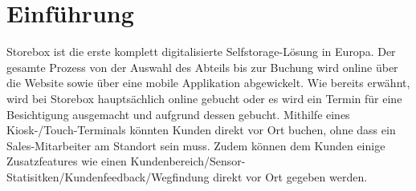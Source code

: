 
\section{Einführung}
Storebox ist die erste komplett digitalisierte Selfstorage-Lösung in Europa. Der gesamte Prozess von der Auswahl des Abteils bis zur Buchung wird online über die Website sowie über eine mobile Applikation abgewickelt. Wie bereits erwähnt, wird bei Storebox hauptsächlich online gebucht oder es wird ein Termin für eine Besichtigung ausgemacht und aufgrund dessen gebucht. Mithilfe eines Kiosk-/Touch-Terminals könnten Kunden direkt vor Ort buchen, ohne dass ein Sales-Mitarbeiter am Standort sein muss. Zudem können dem Kunden einige Zusatzfeatures wie einen Kundenbereich/Sensor-Statisitken/Kundenfeedback/Wegfindung direkt vor Ort gegeben werden. 
